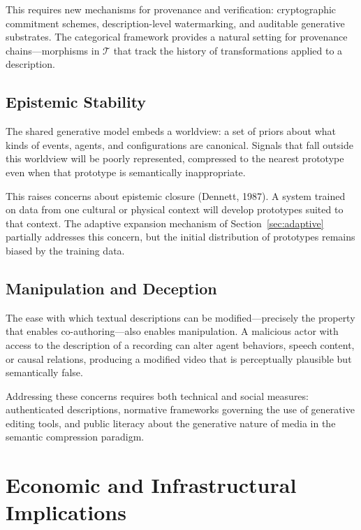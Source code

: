 \documentclass[11pt,a4paper]{article}
\theoremstyle{definition}
\theoremstyle{remark}
\begin{document}
This requires new mechanisms for provenance and verification: cryptographic commitment schemes, description-level watermarking, and auditable generative substrates. The categorical framework provides a natural setting for provenance chains---morphisms in $\mathcal{T}$ that track the history of transformations applied to a description.

\subsection{Epistemic Stability}

The shared generative model embeds a worldview: a set of priors about what kinds of events, agents, and configurations are canonical. Signals that fall outside this worldview will be poorly represented, compressed to the nearest prototype even when that prototype is semantically inappropriate.

This raises concerns about epistemic closure (Dennett, 1987). A system trained on data from one cultural or physical context will develop prototypes suited to that context. The adaptive expansion mechanism of Section~\ref{sec:adaptive} partially addresses this concern, but the initial distribution of prototypes remains biased by the training data.

\subsection{Manipulation and Deception}

The ease with which textual descriptions can be modified---precisely the property that enables co-authoring---also enables manipulation. A malicious actor with access to the description of a recording can alter agent behaviors, speech content, or causal relations, producing a modified video that is perceptually plausible but semantically false.

Addressing these concerns requires both technical and social measures: authenticated descriptions, normative frameworks governing the use of generative editing tools, and public literacy about the generative nature of media in the semantic compression paradigm.

\section{Economic and Infrastructural Implications}
\label{sec:economics}
\end{document}
